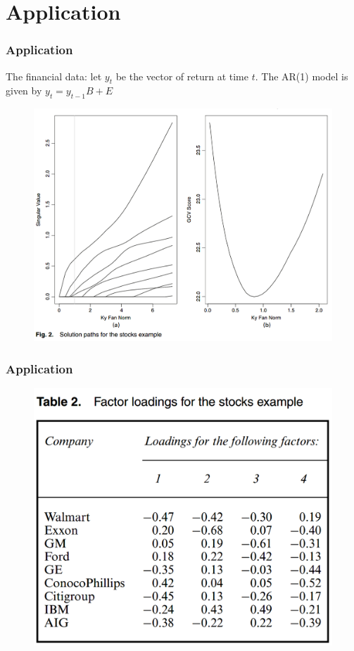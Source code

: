 \documentclass{beamer}
\begin{document}
	\section{Application}
	\begin{frame}
		\frametitle{Application}
		The financial data: let $y_t$ be the vector of return at time $t$. The AR(1) model is given by $y_t =y_{t-1}B + E$
		\begin{figure}
			\includegraphics[width=.7\linewidth]{image009.png}
		\end{figure}
	\end{frame}
	
	\begin{frame}
		\frametitle{Application}
		\begin{figure}
			\includegraphics[width=.7\linewidth]{image010.png}
		\end{figure}
	\end{frame}
	
\end{document}
